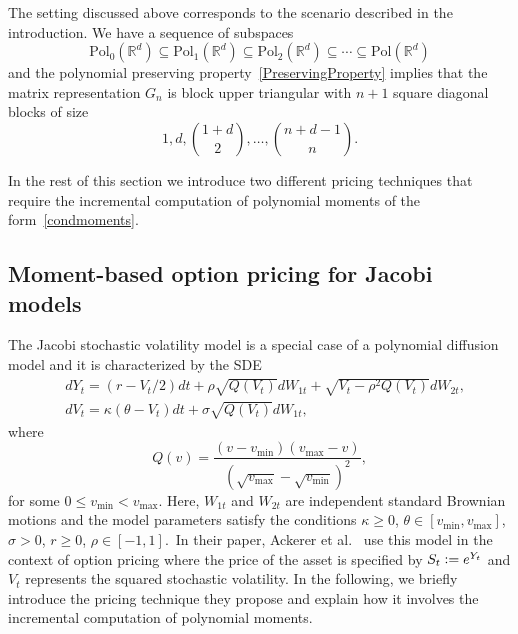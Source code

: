The setting discussed above corresponds to the scenario described in the introduction. We have a sequence of subspaces
\[ \text{Pol}_0(\mathbb{R}^d) \subseteq \text{Pol}_1(\mathbb{R}^d) \subseteq \text{Pol}_2(\mathbb{R}^d) \subseteq \cdots \subseteq \text{Pol}(\mathbb{R}^d)\]
and the polynomial preserving property~\eqref{PreservingProperty} implies that the matrix representation $G_n$ is block upper triangular with $n+1$ square diagonal blocks of size \[1, d, \binom{1+d}{2}, \ldots, \binom{n+d-1}{n}.\]

In the rest of this section we introduce two different pricing techniques that require the incremental computation of polynomial moments of the form~\eqref{condmoments}. %

\subsection{Moment-based option pricing for Jacobi models} \label{sec:jacobix}
The Jacobi stochastic volatility model is a special case of a polynomial diffusion model and it is characterized by the SDE
\begin{align*}
&dY_t=(r-V_t/2)dt + \rho \sqrt{Q(V_t)} dW_{1t}+\sqrt{V_t-\rho^2Q(V_t)}dW_{2t},\\
&dV_t=\kappa(\theta -V_t)dt+\sigma \sqrt{Q(V_t)}dW_{1t},
\end{align*}
where 
\begin{equation*}
Q(v)=\frac{(v-v_{\min})(v_{\max}-v)}{(\sqrt{v_{\max}}-\sqrt{v_{\min}})^2},
\end{equation*}
for some $0 \leq v_{\min} < v_{\max}$. Here, $W_{1t}$ and $W_{2t}$ are independent standard Brownian motions and the model parameters satisfy the conditions $\kappa \geq 0$, $\theta \in [v_{\min},v_{\max}]$, $\sigma >0$, $r \geq 0$, $\rho \in [-1,1]$.\
In their paper, Ackerer et al.~\cite{ackerer2016jacobi} use this model in the context of option pricing where the price of the asset is specified by $S_t \mathrel{\mathop:}= e^{Y_t}$ and $V_t$ represents the squared stochastic volatility. In the following, we briefly introduce the pricing technique they propose and  explain how it involves the incremental computation of polynomial moments. 


